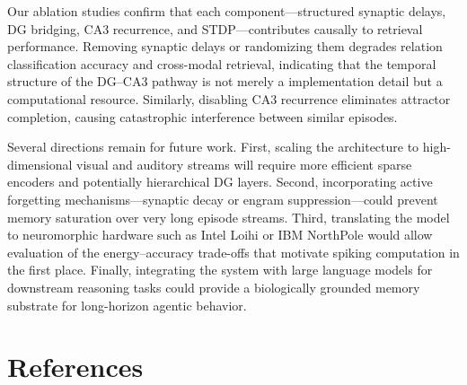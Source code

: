 Our ablation studies confirm that each component---structured synaptic delays, DG bridging, CA3 recurrence, and STDP---contributes causally to retrieval performance. Removing synaptic delays or randomizing them degrades relation classification accuracy and cross-modal retrieval, indicating that the temporal structure of the DG--CA3 pathway is not merely a implementation detail but a computational resource. Similarly, disabling CA3 recurrence eliminates attractor completion, causing catastrophic interference between similar episodes.

Several directions remain for future work. First, scaling the architecture to high-dimensional visual and auditory streams will require more efficient sparse encoders and potentially hierarchical DG layers. Second, incorporating active forgetting mechanisms---synaptic decay or engram suppression---could prevent memory saturation over very long episode streams. Third, translating the model to neuromorphic hardware such as Intel Loihi or IBM NorthPole would allow evaluation of the energy--accuracy trade-offs that motivate spiking computation in the first place. Finally, integrating the system with large language models for downstream reasoning tasks could provide a biologically grounded memory substrate for long-horizon agentic behavior.


\section*{References}


